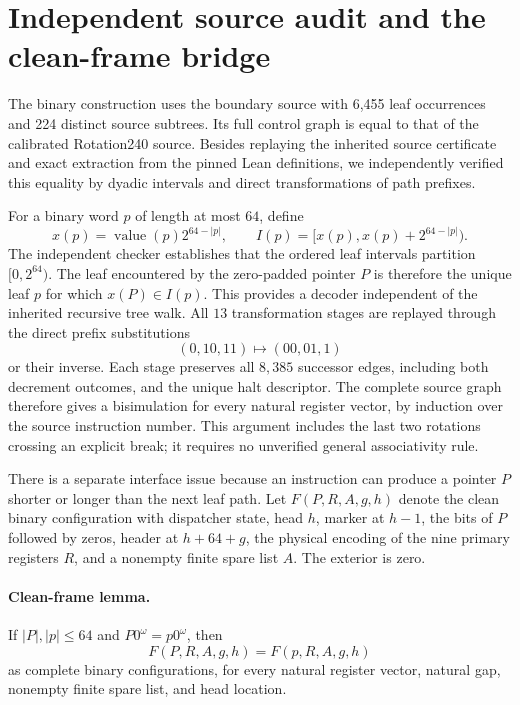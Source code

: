 \section{Independent source audit and the clean-frame bridge}
\label{sec:source}

The binary construction uses the boundary source with 6,455 leaf
occurrences and 224 distinct source subtrees.  Its full control graph is
equal to that of the calibrated Rotation240 source.  Besides replaying
the inherited source certificate and exact extraction from the pinned Lean
definitions, we independently verified this equality by dyadic intervals
and direct transformations of path prefixes.

For a binary word $p$ of length at most $64$, define
\[
 x(p)=\operatorname{value}(p)2^{64-|p|},\qquad
 I(p)=[x(p),x(p)+2^{64-|p|}).
\]
The independent checker establishes that the ordered leaf intervals
partition $[0,2^{64})$.  The leaf encountered by the zero-padded pointer
$P$ is therefore the unique leaf $p$ for which $x(P)\in I(p)$.
This provides a decoder independent of the inherited recursive tree
walk.  All $13$ transformation stages are replayed through the direct
prefix substitutions
\[
 (0,10,11)\longmapsto(00,01,1)
\]
or their inverse.  Each stage preserves all $8,385$ successor edges,
including both decrement outcomes, and the unique halt descriptor.
The complete source graph therefore gives a bisimulation for every
natural register vector, by induction over the source instruction number.
This argument includes the last two rotations crossing an explicit break;
it requires no unverified general associativity rule.

There is a separate interface issue because an instruction can produce
a pointer $P$ shorter or longer than the next leaf path.  Let
$F(P,R,A,g,h)$ denote the clean binary configuration with dispatcher
state, head $h$, marker at $h-1$, the bits of $P$ followed by zeros,
header at $h+64+g$, the physical encoding of the nine primary registers
$R$, and a nonempty finite spare list $A$.  The exterior is zero.

\paragraph{Clean-frame lemma.}
If $|P|,|p|\leq64$ and $P0^\omega=p0^\omega$, then
\[
 F(P,R,A,g,h)=F(p,R,A,g,h)
\]
as complete binary configurations, for every natural register vector,
natural gap, nonempty finite spare list, and head location.

